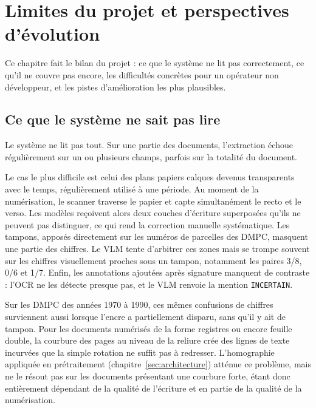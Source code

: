 
\section{Limites du projet et perspectives d'évolution}
\label{sec:limites_perspectives}

Ce chapitre fait le bilan du projet : ce que le système ne lit pas correctement, ce qu'il ne couvre pas encore, les difficultés concrètes pour un opérateur non développeur, et les pistes d'amélioration les plus plausibles.


\subsection{Ce que le système ne sait pas lire}

Le système ne lit pas tout. Sur une partie des documents, l'extraction échoue régulièrement sur un ou plusieurs champs, parfois sur la totalité du document.

Le cas le plus difficile est celui des plans papiers calques devenus transparents avec le temps, régulièrement utilisé à une période. Au moment de la numérisation, le scanner traverse le papier et capte simultanément le recto et le verso. Les modèles reçoivent alors deux couches d'écriture superposées qu'ils ne peuvent pas distinguer, ce qui rend la correction manuelle systématique. Les tampons, apposés directement sur les numéros de parcelles des DMPC, masquent une partie des chiffres. Le VLM tente d'arbitrer ces zones mais se trompe souvent sur les chiffres visuellement proches sous un tampon, notamment les paires 3/8, 0/6 et 1/7. Enfin, les annotations ajoutées après signature manquent de contraste : l'OCR ne les détecte presque pas, et le VLM renvoie la mention \texttt{INCERTAIN}.

Sur les DMPC des années 1970 à 1990, ces mêmes confusions de chiffres surviennent aussi lorsque l'encre a partiellement disparu, sans qu'il y ait de tampon. Pour les documents numérisés de la forme registres ou encore feuille double, la courbure des pages au niveau de la reliure crée des lignes de texte incurvées que la simple rotation ne suffit pas à redresser. L'homographie appliquée en prétraitement (chapitre~\ref{sec:architecture}) atténue ce problème, mais ne le résout pas sur les documents présentant une courbure forte, étant donc entièrement dépendant de la qualité de l'écriture et en partie de la qualité de la numérisation.


